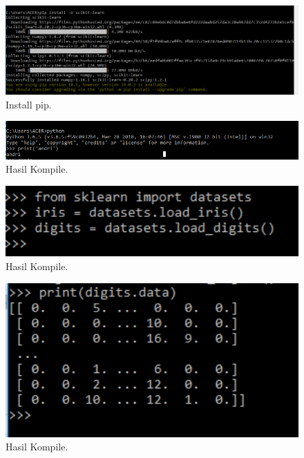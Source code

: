 \begin{enumerate}
\begin{figure}[ht]\centerline{\includegraphics[width=1\textwidth]{figures/333.PNG}}\caption{Install pip.}\end{figure}

\begin{figure}[ht]\centerline{\includegraphics[width=1\textwidth]{figures/444.PNG}}\caption{Hasil Kompile.}\end{figure}

\begin{figure}[ht]\centerline{\includegraphics[width=1\textwidth]{figures/555.PNG}}\caption{Hasil Kompile.}\end{figure}

\begin{figure}[ht]\centerline{\includegraphics[width=1\textwidth]{figures/666.PNG}}\caption{Hasil Kompile.}\end{figure}
\end{enumerate}



